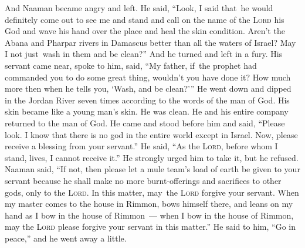 \begin{inparaenum}
   And Naaman became angry and left. He said, ``Look, I said that\understood\ he would definitely come out to see me and stand and call on the name of the \textsc{Lord} his God and wave his hand over the place and heal the skin condition.%
   Aren't the Abana and Pharpar rivers in Damascus better than all the waters of Israel? May I not just\understood\ wash in them and be clean?'' And he turned and left in a fury.%
   His servant came near, spoke to him, said, ``My father, if\understood\ the prophet had commanded you to do some great thing, wouldn't you have done it? How much more then when he tells you, `Wash, and be clean?'\thinspace''%
   He went down and dipped in the Jordan River seven times according to the words of the man of God. His skin became like a young man's skin. He was clean.%
   He and his entire company returned to the man of God. He came and stood before him and said, ``Please look. I know that there is no god in the entire world except in Israel. Now, please receive a blessing from your servant.''%
   He said, ``As the \textsc{Lord}, before whom I stand, lives, I cannot receive it.'' He strongly urged him to take it, but he refused.%
   Naaman said, ``If not, then please let a mule team's load of earth be given to your servant because he shall make no more burnt-offerings and sacrifices to other gods, only to the \textsc{Lord}.%
   In this matter, may\understood\ the \textsc{Lord} forgive your servant. When my master comes to the house in Rimmon, bows himself there, and leans on my hand as I bow in the house of Rimmon~--- when I bow in the house of Rimmon, may the \textsc{Lord} please forgive your servant in this matter.''%
   He said to him, ``Go in peace,'' and he went away a little.%
  

\end{inparaenum}
